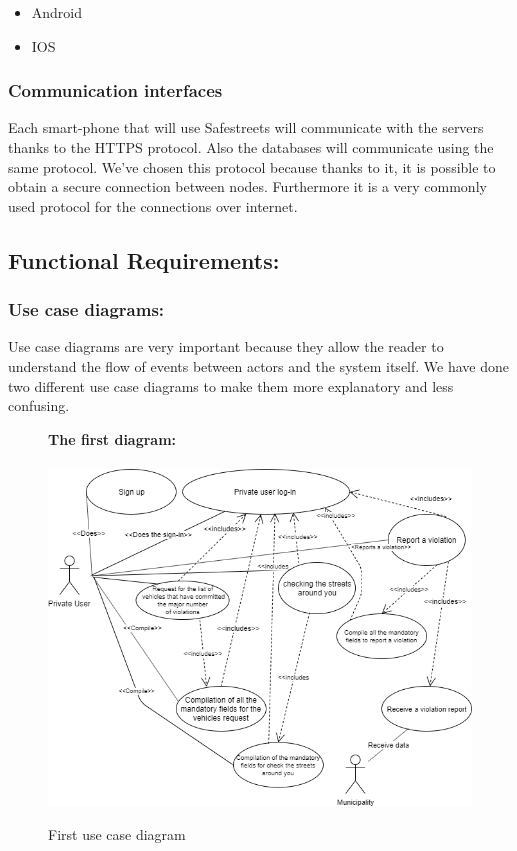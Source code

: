 \documentclass[titlepage]{article}
\begin{document}
\begin{itemize}
	\item Android 
	\item IOS
\end{itemize}
	
\subsubsection{Communication interfaces }
Each smart-phone that will use Safestreets will communicate with the servers thanks to the HTTPS protocol. Also the databases will communicate using the same protocol. We've chosen this protocol because thanks to it, it is possible to obtain a secure connection between nodes. Furthermore it is a very commonly used protocol for the connections over internet.
\subsection{Functional Requirements:}
\subsubsection{Use case diagrams: }
Use case diagrams are very important because they allow the reader to understand the flow of events between actors and the system itself. We have done two different use case diagrams to make them more explanatory and less confusing.

\begin{figure}[h]
	\textbf{The first diagram:\\ \\}
	\includegraphics[scale=0.65]{use case diagrams/use case diagrams.png}
	\centering
	\caption{First use case diagram}
\end{figure}
\FloatBarrier
\end{document}
